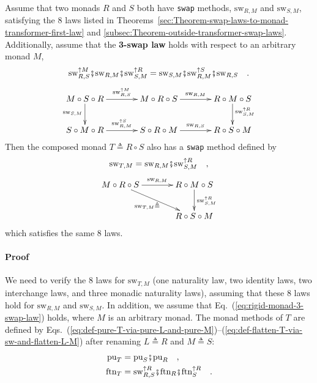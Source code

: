 Assume that two monads $R$ and $S$ both have \lstinline!swap!
methods, $\text{sw}_{R,M}$ and $\text{sw}_{S,M}$, satisfying the
$8$ laws listed in Theorems~\ref{sec:Theorem-swap-laws-to-monad-transformer-first-law}
and \ref{subsec:Theorem-outside-transformer-swap-laws}. Additionally,
assume that the \textbf{3-swap law} holds
with respect to an arbitrary monad $M$,
\begin{equation}
\text{sw}_{R,S}^{\uparrow M}\bef\text{sw}_{R,M}\bef\text{sw}_{S,M}^{\uparrow R}=\text{sw}_{S,M}\bef\text{sw}_{R,M}^{\uparrow S}\bef\text{sw}_{R,S}\quad.\label{eq:rigid-monad-3-swap-law}
\end{equation}
\[
\xymatrix{\xyScaleY{2pc}\xyScaleX{3pc}M\circ S\circ R\ar[d]\sb(0.45){\text{sw}_{S,M}}\ar[r]\sp(0.5){\text{sw}_{R,S}^{\uparrow M}} & M\circ R\circ S\ar[r]\sp(0.5){\text{sw}_{R,M}} & R\circ M\circ S\ar[d]\sp(0.4){\text{sw}_{S,M}^{\uparrow R}}\\
S\circ M\circ R\ar[r]\sp(0.5){\text{sw}_{R,M}^{\uparrow S}} & S\circ R\circ M\ar[r]\sp(0.5){\text{sw}_{R,S}} & R\circ S\circ M
}
\]
Then the composed monad $T\triangleq R\circ S$ also has a \lstinline!swap!
method defined by 
\begin{equation}
\text{sw}_{T,M}=\text{sw}_{R,M}\bef\text{sw}_{S,M}^{\uparrow R}\quad,\label{eq:3-swap-def-of-sw-T-M}
\end{equation}
\[
\xymatrix{\xyScaleY{2pc}\xyScaleX{3pc}M\circ R\circ S\ar[rd]\sb(0.45){\text{sw}_{T,M}\triangleq}\ar[r]\sp(0.5){\text{sw}_{R,M}} & R\circ M\circ S\ar[d]\sp(0.5){\text{sw}_{S,M}^{\uparrow R}}\\
 & R\circ S\circ M
}
\]
which satisfies the same $8$ laws.

\paragraph{Proof}

We need to verify the $8$ laws for $\text{sw}_{T,M}$ (one naturality
law, two identity laws, two interchange laws, and three monadic naturality
laws), assuming that these $8$ laws hold for $\text{sw}_{R,M}$ and
$\text{sw}_{S,M}$. In addition, we assume that Eq.~(\ref{eq:rigid-monad-3-swap-law})
holds, where $M$ is an arbitrary monad. The monad methods of $T$
are defined by Eqs.~(\ref{eq:def-pure-T-via-pure-L-and-pure-M})–(\ref{eq:def-flatten-T-via-sw-and-flatten-L-M})
after renaming $L\triangleq R$ and $M\triangleq S$:
\begin{align}
\text{pu}_{T} & =\text{pu}_{S}\bef\text{pu}_{R}\quad,\label{eq:3-swap-pu-T-via-pu-R-S}\\
\text{ftn}_{T} & =\text{sw}_{R,S}^{\uparrow R}\bef\text{ftn}_{R}\bef\text{ftn}_{S}^{\uparrow R}\quad.\label{eq:3-swap-ftn-T-via-sw-R-S}
\end{align}

